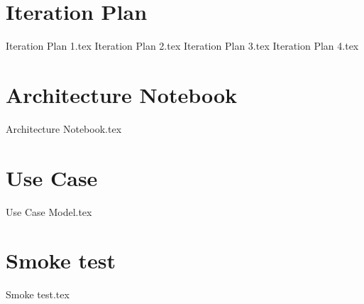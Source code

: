 \documentclass[a4paper,11pt]{book}
\begin{document}
\chapter{Iteration Plan}
{Iteration Plan 1.tex}
{Iteration Plan 2.tex}
{Iteration Plan 3.tex}
{Iteration Plan 4.tex}

\chapter{Architecture Notebook}
{Architecture Notebook.tex}

\chapter{Use Case}
{Use Case Model.tex}

\chapter{Smoke test}
{Smoke test.tex}

\printglossary
\end{document}
